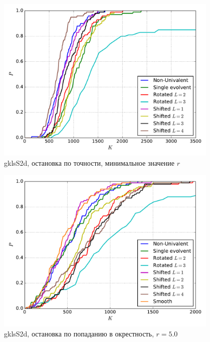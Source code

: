 \documentclass[a4paper]{article}
\begin{document}
\begin{figure}[H]
  \center
  \includegraphics[width=0.95\textwidth]{../gklsS2d/accuracy/gklsS2d_acc_op.pdf}
  \caption{gklsS2d, остановка по точности, минимальное значение $r$}
  \label{fig:}
\end{figure}

\begin{figure}[H]
  \center
  \includegraphics[width=0.95\textwidth]{../gklsS2d/same_r/opt_point/gklsS2d_same_r_opt_pt_op.pdf}
  \caption{gklsS2d, остановка по попаданию в окрестность, $r=5.0$}
  \label{fig:}
\end{figure}
\end{document}
